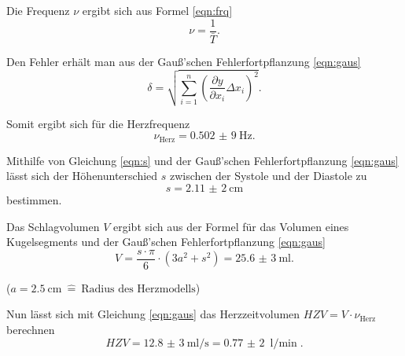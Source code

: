 Die Frequenz $\nu$ ergibt sich aus Formel \eqref{eqn:frq}
\begin{equation}
  \nu = \frac{1}{\bar{T}}.
  \label{eqn:frq}
\end{equation}

Den Fehler erhält man aus der Gauß'schen Fehlerfortpflanzung \eqref{eqn:gaus}
\begin{equation}
  \delta = \sqrt{\sum_{i=1}^{n}\left(\frac{\partial y}{\partial x_i} \Delta x_i\right)^2}.
  \label{eqn:gaus}
\end{equation}

Somit ergibt sich für die Herzfrequenz
\begin{equation*}
  \nu_\text{Herz} = \SI{0,502(9)}{\Hz}.
\end{equation*}

Mithilfe von Gleichung \eqref{eqn:s} und der Gauß'schen Fehlerfortpflanzung \eqref{eqn:gaus} lässt sich der Höhenunterschied $s$ zwischen
der Systole und der Diastole zu
\begin{equation*}
  s = \SI{2,11(2)}{\cm}
\end{equation*}
bestimmen.

Das Schlagvolumen $V$ ergibt sich aus der Formel für das Volumen eines Kugelsegments und der Gauß'schen Fehlerfortpflanzung \eqref{eqn:gaus}
\begin{equation*}
  V = \frac{s \cdot \pi}{6} \cdot \left(3a^2 + s^2 \right)= \SI{25,6(3)}{\ml}.
  \label{eqn:vol}
\end{equation*}
\begin{center}
  \tiny{($a = \SI{2,5}{\cm} \: \hat{=} \: \text{Radius des Herzmodells}$)}
\end{center}

Nun lässt sich mit Gleichung \eqref{eqn:gaus} das Herzzeitvolumen $HZV = V \cdot \nu_\text{Herz}$ berechnen
\begin{equation*}
  HZV = \SI{12,8(3)}{\ml \per \s} = \SI{0,77(2)}{\l \per \min}.
\end{equation*}
